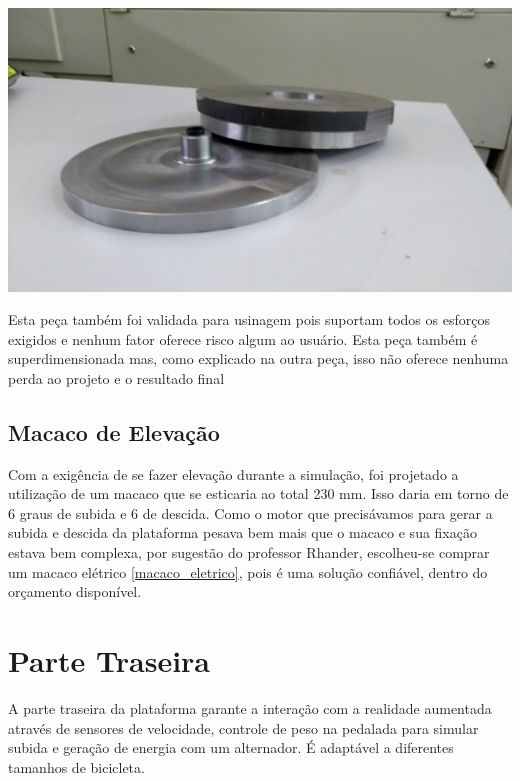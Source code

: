     \begin{center}
    	\includegraphics[scale=0.7]{figuras/mesa_giratoria_1}
        \label{mesa_giratoria_1}
    \end{center}

    Esta peça também foi validada para usinagem pois suportam todos os esforços exigidos e nenhum fator oferece risco algum ao usuário. Esta peça também é superdimensionada mas, como explicado na outra peça, isso não oferece nenhuma perda ao projeto e o resultado final

\subsection{Macaco de Elevação}

    Com a exigência de se fazer elevação durante a simulação, foi projetado a utilização de um macaco que se esticaria ao total 230 mm. Isso daria em torno de 6 graus de subida e 6 de descida. Como o motor que precisávamos para gerar a subida e descida da plataforma pesava bem mais que o macaco e sua fixação estava bem complexa, por sugestão do professor Rhander, escolheu-se comprar um macaco elétrico \ref{macaco_eletrico}, pois é uma solução confiável, dentro do orçamento disponível.


\section{Parte Traseira}
    A parte traseira da plataforma garante a interação com a realidade aumentada através de sensores de velocidade, controle de peso na pedalada para simular subida e geração de energia com um alternador. É adaptável a diferentes tamanhos de bicicleta.

